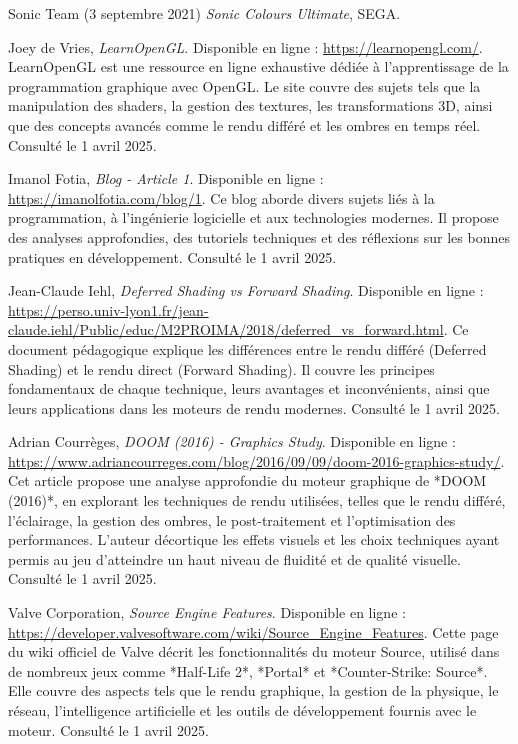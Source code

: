 \begin{thebibliography}{9}
    Sonic Team (3 septembre 2021) \emph{Sonic Colours Ultimate}, SEGA.
    
    Joey de Vries, \textit{LearnOpenGL}.  
    Disponible en ligne : \url{https://learnopengl.com/}.  
    LearnOpenGL est une ressource en ligne exhaustive dédiée à l'apprentissage de la programmation graphique avec OpenGL.  
    Le site couvre des sujets tels que la manipulation des shaders, la gestion des textures, les transformations 3D,  
    ainsi que des concepts avancés comme le rendu différé et les ombres en temps réel.  
    Consulté le 1 avril 2025.

    Imanol Fotia, \textit{Blog - Article 1}.  
    Disponible en ligne : \url{https://imanolfotia.com/blog/1}.  
    Ce blog aborde divers sujets liés à la programmation, à l'ingénierie logicielle et aux technologies modernes.  
    Il propose des analyses approfondies, des tutoriels techniques et des réflexions sur les bonnes pratiques en développement.  
    Consulté le 1 avril 2025.

    Jean-Claude Iehl, \textit{Deferred Shading vs Forward Shading}.  
    Disponible en ligne : \url{https://perso.univ-lyon1.fr/jean-claude.iehl/Public/educ/M2PROIMA/2018/deferred_vs_forward.html}.  
    Ce document pédagogique explique les différences entre le rendu différé (Deferred Shading) et le rendu direct (Forward Shading).  
    Il couvre les principes fondamentaux de chaque technique, leurs avantages et inconvénients, ainsi que leurs applications  
    dans les moteurs de rendu modernes.  
    Consulté le 1 avril 2025.

    Adrian Courrèges, \textit{DOOM (2016) - Graphics Study}.  
    Disponible en ligne : \url{https://www.adriancourreges.com/blog/2016/09/09/doom-2016-graphics-study/}.  
    Cet article propose une analyse approfondie du moteur graphique de *DOOM (2016)*, en explorant les techniques de rendu utilisées,  
    telles que le rendu différé, l'éclairage, la gestion des ombres, le post-traitement et l'optimisation des performances.  
    L'auteur décortique les effets visuels et les choix techniques ayant permis au jeu d'atteindre un haut niveau de fluidité et de qualité visuelle.  
    Consulté le 1 avril 2025.

    Valve Corporation, \textit{Source Engine Features}.  
    Disponible en ligne : \url{https://developer.valvesoftware.com/wiki/Source_Engine_Features}.  
    Cette page du wiki officiel de Valve décrit les fonctionnalités du moteur Source, utilisé dans de nombreux jeux  
    comme *Half-Life 2*, *Portal* et *Counter-Strike: Source*. Elle couvre des aspects tels que le rendu graphique,  
    la gestion de la physique, le réseau, l'intelligence artificielle et les outils de développement fournis avec le moteur.  
    Consulté le 1 avril 2025.


\end{thebibliography}
